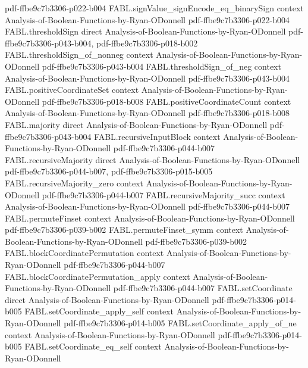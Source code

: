 \begin{theorem}
  {pdf-ffbe9c7b3306-p022-b004}
\proofstep
  {FABL.signValue_signEncode_eq_binarySign}
  {context}
  {Analysis-of-Boolean-Functions-by-Ryan-ODonnell}
  {pdf-ffbe9c7b3306-p022-b004}
\proofstep
  {FABL.thresholdSign}
  {direct}
  {Analysis-of-Boolean-Functions-by-Ryan-ODonnell}
  {pdf-ffbe9c7b3306-p043-b004,
    pdf-ffbe9c7b3306-p018-b002}
\proofstep
  {FABL.thresholdSign_of_nonneg}
  {context}
  {Analysis-of-Boolean-Functions-by-Ryan-ODonnell}
  {pdf-ffbe9c7b3306-p043-b004}
\proofstep
  {FABL.thresholdSign_of_neg}
  {context}
  {Analysis-of-Boolean-Functions-by-Ryan-ODonnell}
  {pdf-ffbe9c7b3306-p043-b004}
\proofstep
  {FABL.positiveCoordinateSet}
  {context}
  {Analysis-of-Boolean-Functions-by-Ryan-ODonnell}
  {pdf-ffbe9c7b3306-p018-b008}
\proofstep
  {FABL.positiveCoordinateCount}
  {context}
  {Analysis-of-Boolean-Functions-by-Ryan-ODonnell}
  {pdf-ffbe9c7b3306-p018-b008}
\proofstep
  {FABL.majority}
  {direct}
  {Analysis-of-Boolean-Functions-by-Ryan-ODonnell}
  {pdf-ffbe9c7b3306-p043-b004}
\proofstep
  {FABL.recursiveInputBlock}
  {context}
  {Analysis-of-Boolean-Functions-by-Ryan-ODonnell}
  {pdf-ffbe9c7b3306-p044-b007}
\proofstep
  {FABL.recursiveMajority}
  {direct}
  {Analysis-of-Boolean-Functions-by-Ryan-ODonnell}
  {pdf-ffbe9c7b3306-p044-b007,
    pdf-ffbe9c7b3306-p015-b005}
\proofstep
  {FABL.recursiveMajority_zero}
  {context}
  {Analysis-of-Boolean-Functions-by-Ryan-ODonnell}
  {pdf-ffbe9c7b3306-p044-b007}
\proofstep
  {FABL.recursiveMajority_succ}
  {context}
  {Analysis-of-Boolean-Functions-by-Ryan-ODonnell}
  {pdf-ffbe9c7b3306-p044-b007}
\proofstep
  {FABL.permuteFinset}
  {context}
  {Analysis-of-Boolean-Functions-by-Ryan-ODonnell}
  {pdf-ffbe9c7b3306-p039-b002}
\proofstep
  {FABL.permuteFinset_symm}
  {context}
  {Analysis-of-Boolean-Functions-by-Ryan-ODonnell}
  {pdf-ffbe9c7b3306-p039-b002}
\proofstep
  {FABL.blockCoordinatePermutation}
  {context}
  {Analysis-of-Boolean-Functions-by-Ryan-ODonnell}
  {pdf-ffbe9c7b3306-p044-b007}
\proofstep
  {FABL.blockCoordinatePermutation_apply}
  {context}
  {Analysis-of-Boolean-Functions-by-Ryan-ODonnell}
  {pdf-ffbe9c7b3306-p044-b007}
\proofstep
  {FABL.setCoordinate}
  {direct}
  {Analysis-of-Boolean-Functions-by-Ryan-ODonnell}
  {pdf-ffbe9c7b3306-p014-b005}
\proofstep
  {FABL.setCoordinate_apply_self}
  {context}
  {Analysis-of-Boolean-Functions-by-Ryan-ODonnell}
  {pdf-ffbe9c7b3306-p014-b005}
\proofstep
  {FABL.setCoordinate_apply_of_ne}
  {context}
  {Analysis-of-Boolean-Functions-by-Ryan-ODonnell}
  {pdf-ffbe9c7b3306-p014-b005}
\proofstep
  {FABL.setCoordinate_eq_self}
  {context}
  {Analysis-of-Boolean-Functions-by-Ryan-ODonnell}

\end{theorem}
